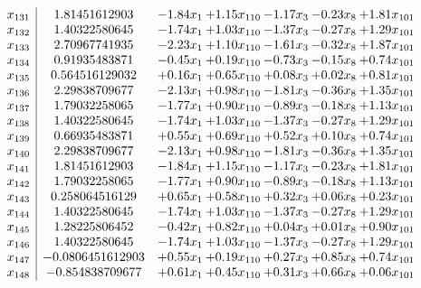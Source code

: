 \documentclass[8pt]{article}
\begin{document}
\[\begin{array}{c| c c@{\hskip 2pt} c@{\hskip 2pt} c@{\hskip 2pt} c@{\hskip 2pt} c@{\hskip 2pt} }
 x_{131}   &  1.81451612903 & -1.84 x_{1} & +  1.15 x_{110} & -1.17 x_{3} & -0.23 x_{8} & +  1.81 x_{101}\\
 x_{132}   &  1.40322580645 & -1.74 x_{1} & +  1.03 x_{110} & -1.37 x_{3} & -0.27 x_{8} & +  1.29 x_{101}\\
 x_{133}   &  2.70967741935 & -2.23 x_{1} & +  1.10 x_{110} & -1.61 x_{3} & -0.32 x_{8} & +  1.87 x_{101}\\
 x_{134}   &  0.91935483871 & -0.45 x_{1} & +  0.19 x_{110} & -0.73 x_{3} & -0.15 x_{8} & +  0.74 x_{101}\\
 x_{135}   &  0.564516129032 & +  0.16 x_{1} & +  0.65 x_{110} & +  0.08 x_{3} & +  0.02 x_{8} & +  0.81 x_{101}\\
 x_{136}   &  2.29838709677 & -2.13 x_{1} & +  0.98 x_{110} & -1.81 x_{3} & -0.36 x_{8} & +  1.35 x_{101}\\
 x_{137}   &  1.79032258065 & -1.77 x_{1} & +  0.90 x_{110} & -0.89 x_{3} & -0.18 x_{8} & +  1.13 x_{101}\\
 x_{138}   &  1.40322580645 & -1.74 x_{1} & +  1.03 x_{110} & -1.37 x_{3} & -0.27 x_{8} & +  1.29 x_{101}\\
 x_{139}   &  0.66935483871 & +  0.55 x_{1} & +  0.69 x_{110} & +  0.52 x_{3} & +  0.10 x_{8} & +  0.74 x_{101}\\
 x_{140}   &  2.29838709677 & -2.13 x_{1} & +  0.98 x_{110} & -1.81 x_{3} & -0.36 x_{8} & +  1.35 x_{101}\\
 x_{141}   &  1.81451612903 & -1.84 x_{1} & +  1.15 x_{110} & -1.17 x_{3} & -0.23 x_{8} & +  1.81 x_{101}\\
 x_{142}   &  1.79032258065 & -1.77 x_{1} & +  0.90 x_{110} & -0.89 x_{3} & -0.18 x_{8} & +  1.13 x_{101}\\
 x_{143}   &  0.258064516129 & +  0.65 x_{1} & +  0.58 x_{110} & +  0.32 x_{3} & +  0.06 x_{8} & +  0.23 x_{101}\\
 x_{144}   &  1.40322580645 & -1.74 x_{1} & +  1.03 x_{110} & -1.37 x_{3} & -0.27 x_{8} & +  1.29 x_{101}\\
 x_{145}   &  1.28225806452 & -0.42 x_{1} & +  0.82 x_{110} & +  0.04 x_{3} & +  0.01 x_{8} & +  0.90 x_{101}\\
 x_{146}   &  1.40322580645 & -1.74 x_{1} & +  1.03 x_{110} & -1.37 x_{3} & -0.27 x_{8} & +  1.29 x_{101}\\
 x_{147}   &  -0.0806451612903 & +  0.55 x_{1} & +  0.19 x_{110} & +  0.27 x_{3} & +  0.85 x_{8} & +  0.74 x_{101}\\
 x_{148}   &  -0.854838709677 & +  0.61 x_{1} & +  0.45 x_{110} & +  0.31 x_{3} & +  0.66 x_{8} & +  0.06 x_{101}\\

\end{array}\]
\end{document}
